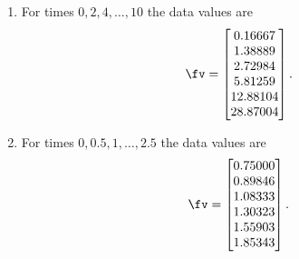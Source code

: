 \begin{exercise}
\begin{enumerate}
\item For times \(0,2,4,\ldots,10\) the data values are 
\setbox\ajrqrbox\hbox{}\marginpar{\usebox{\ajrqrbox}}%
\[ \fv=\begin{bmatrix} 0.16667
\\ 1.38889
\\ 2.72984
\\ 5.81259
\\ 12.88104
\\ 28.87004 \end{bmatrix}.\]
  
\item For times \(0,0.5,1,\ldots,2.5\) the data values are 
\setbox\ajrqrbox\hbox{}\marginpar{\usebox{\ajrqrbox}}%
\[ \fv=\begin{bmatrix} 0.75000
\\ 0.89846
\\ 1.08333
\\ 1.30323
\\ 1.55903
\\ 1.85343 \end{bmatrix}.\]
  
\end{enumerate}
\end{exercise}



